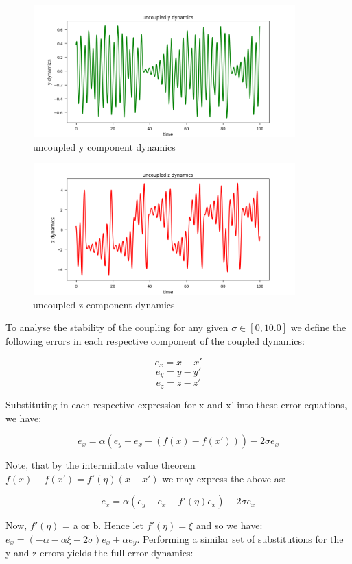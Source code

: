 \documentclass{article}
\begin{document}
\begin{figure}[H]
\centering
\includegraphics[width = 4in, height = 2in]{y_dynamics_t.png}
\caption{uncoupled y component dynamics}
\end{figure}

\begin{figure}[H]
\centering
\includegraphics[width = 4in, height = 2in]{z_dynamics_t.png}
\caption{uncoupled z component dynamics}
\end{figure}


To analyse the stability of the coupling for any given $\sigma \in [0, 10.0]$ we define the following
errors in each respective component of the coupled dynamics:

$$e_{x} = x - x'$$
$$e_{y} = y - y'$$
$$e_{z} = z - z'$$

Substituting in each respective expression for x and x' into these error equations, we have:

$$e_{x} = \alpha(e_{y} - e_{x} - (f(x) - f(x'))) - 2\sigma e_{x}$$


Note, that by the intermidiate value theorem $f(x) - f(x') = f'(\eta)(x - x')$ we may express the above as:

$$e_{x} = \alpha(e_{y} - e_{x} - f'(\eta)e_{x}) - 2\sigma e_{x}$$

Now, $f'(\eta)$ = a or b. Hence let $f'(\eta) = \xi$ and so
we have: $e_{x} = (-\alpha - \alpha\xi - 2\sigma)e_{x} + \alpha e_{y}$. Performing a
similar set of substitutions for the y and z errors yields the full error dynamics:
\end{document}
